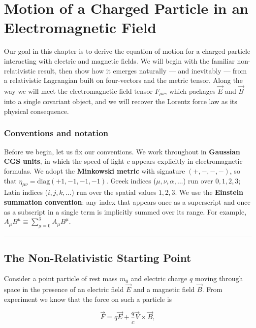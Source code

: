 \chapter{Motion of a Charged Particle in an Electromagnetic Field}

Our goal in this chapter is to derive the equation of motion for a charged particle interacting with electric and magnetic fields. We will begin with the familiar non-relativistic result, then show how it emerges naturally --- and inevitably --- from a relativistic Lagrangian built on four-vectors and the metric tensor. Along the way we will meet the electromagnetic field tensor $F_{\mu\nu}$, which packages $\vec{E}$ and $\vec{B}$ into a single covariant object, and we will recover the Lorentz force law as its physical consequence.

\subsection*{Conventions and notation}

Before we begin, let us fix our conventions. We work throughout in \textbf{Gaussian CGS units}, in which the speed of light $c$ appears explicitly in electromagnetic formulas. We adopt the \textbf{Minkowski metric} with signature $(+,-,-,-)$, so that $\eta_{\mu\nu} = \text{diag}(+1,-1,-1,-1)$. Greek indices ($\mu, \nu, \alpha, \ldots$) run over $0,1,2,3$; Latin indices ($i, j, k, \ldots$) run over the spatial values $1,2,3$. We use the \textbf{Einstein summation convention}: any index that appears once as a superscript and once as a subscript in a single term is implicitly summed over its range. For example, $A_\mu B^\mu \equiv \sum_{\mu=0}^{3} A_\mu B^\mu$.

\hrule
\vspace{1em}

\section{The Non-Relativistic Starting Point}

Consider a point particle of rest mass $m_0$ and electric charge $q$ moving through space in the presence of an electric field $\vec{E}$ and a magnetic field $\vec{B}$. From experiment we know that the force on such a particle is

\begin{equation}
\vec{F} = q\vec{E} + \frac{q}{c}\vec{V} \times \vec{B},
\end{equation}

